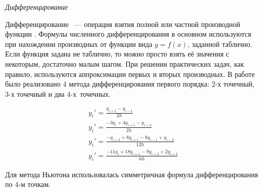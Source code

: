 \textit{Дифференцирование}

Дифференцирование ~--- операция взятия полной или частной производной функции \cite{book11}. Формулы численного дифференцирования
в основном
используются при нахождении производных от функции вида $y = f(x)$, заданной таблично. Если функция задана не таблично, то
можно просто взять её значения с некоторым, достаточно малым шагом. При решении практических задач, как правило,
используются аппроксимации
первых и вторых производных. В работе было реализовано 4 метода
дифференцирования первого порядка: 2-х точечный, 3-х точечный и два 4-х~точечных.

\begin{equation}
    \begin{gathered}
        y_i' = \frac{y_{i+1} - y_{i-1}}{2h}\\
        y_i' = \frac{-3y_{i} + 4y_{i+1} - y_{i+2}}{2h}\\
        y_i' = \frac{-y_{i+2} + 8y_{i+1} - 8y_{i-1} + y_{i-2}}{12h}\\
        y_i' = \frac{-11y_{i} + 18y_{i+1} - 9y_{i+2} + 2y_{i+3}}{6h}
    \end{gathered}
    \label{eq:Diff}
\end{equation}

Для метода Ньютона использовалась симметричная формула дифференцирования по 4-м точкам.